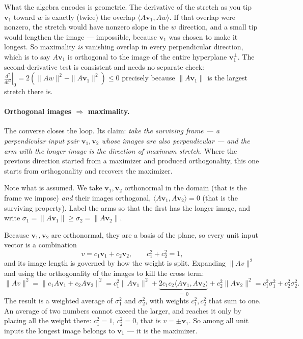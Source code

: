 \documentclass[11pt]{article}
\numberwithin{equation}{section}
\newcommand{\ip}[2]{\langle #1, #2 \rangle}
\newcommand{\vv}[1]{\mathbf{v}_{#1}}
\theoremstyle{plainish}
\begin{document}
What the algebra encodes is geometric. The derivative of the stretch as you tip
$\vv1$ toward $w$ is exactly (twice) the overlap $\ip{A\vv1}{Aw}$. If that
overlap were nonzero, the stretch would have nonzero slope in the $w$ direction,
and a small tip would lengthen the image --- impossible, because $\vv1$ was
chosen to make it longest. So maximality \emph{is} vanishing overlap in every
perpendicular direction, which is to say $A\vv1$ is orthogonal to the image of
the entire hyperplane $\vv1^\perp$. The second-derivative test is consistent and
needs no separate check: $\left.\frac{d^2}{dt^2}\right|_0 = 2(\|Aw\|^2 - \|A\vv1\|^2) \leq 0$
precisely because $\|A\vv1\|$ is the largest stretch there is.

\paragraph{Orthogonal images $\Rightarrow$ maximality.} The converse closes the
loop. Its claim: \emph{take the surviving frame --- a perpendicular input pair
$\vv1, \vv2$ whose images are also perpendicular --- and the arm with the longer
image is the direction of maximum stretch.} Where the previous direction started
from a maximizer and produced orthogonality, this one starts from orthogonality
and recovers the maximizer.

Note what is assumed. We take $\vv1, \vv2$ orthonormal in the domain (that is
the frame we impose) \emph{and} their images orthogonal, $\ip{A\vv1}{A\vv2} = 0$
(that is the surviving property). Label the arms so that the first has the
longer image, and write $\sigma_1 = \|A\vv1\| \geq \sigma_2 = \|A\vv2\|$.

Because $\vv1, \vv2$ are orthonormal, they are a basis of the plane, so every
unit input vector is a combination
\begin{equation}v = c_1 \vv1 + c_2 \vv2, \qquad c_1^2 + c_2^2 = 1 ,
\end{equation}
and its image length is governed by how the weight is split. Expanding
$\|Av\|^2$ and using the orthogonality of the images to kill the cross term:
\begin{equation}\|Av\|^2 = \|c_1 A\vv1 + c_2 A\vv2\|^2
= c_1^2 \|A\vv1\|^2 + \underbrace{2c_1c_2\ip{A\vv1}{A\vv2}}_{=\,0} + c_2^2\|A\vv2\|^2
= c_1^2\sigma_1^2 + c_2^2\sigma_2^2 .
\end{equation}
The result is a weighted average of $\sigma_1^2$ and $\sigma_2^2$, with weights
$c_1^2, c_2^2$ that sum to one. An average of two numbers cannot exceed the
larger, and reaches it only by placing all the weight there: $c_1^2 = 1$,
$c_2^2 = 0$, that is $v = \pm\vv1$. So among all unit inputs the longest image
belongs to $\vv1$ --- it is the maximizer.
\end{document}
